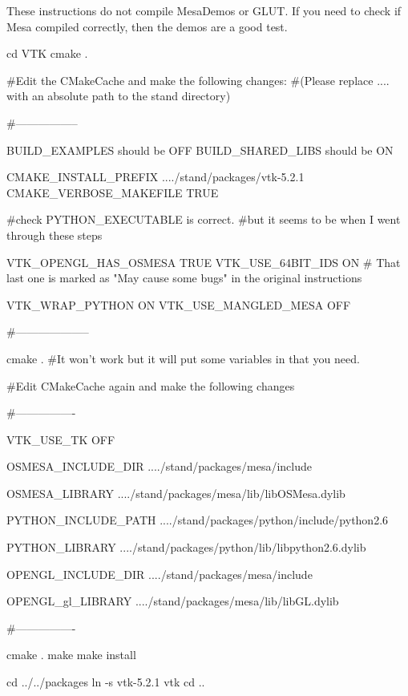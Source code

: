 These instructions do not compile MesaDemos or GLUT.
If you need to check if Mesa compiled correctly, then the demos are a good test.

\begin{shellCode}
cd VTK
cmake .

#Edit the CMakeCache and make the following changes: 
#(Please replace .... with an absolute path to the stand directory)

#-----------------

BUILD_EXAMPLES should be OFF
BUILD_SHARED_LIBS should be ON

CMAKE_INSTALL_PREFIX	..../stand/packages/vtk-5.2.1
CMAKE_VERBOSE_MAKEFILE	TRUE

#check PYTHON_EXECUTABLE is correct.
#but it seems to be when I went through these steps

VTK_OPENGL_HAS_OSMESA	TRUE
VTK_USE_64BIT_IDS	ON
# That last one is marked as "May cause some bugs" in the original instructions

VTK_WRAP_PYTHON	ON
VTK_USE_MANGLED_MESA	OFF

#--------------------

cmake .
#It won't work but it will put some variables in that you need.

#Edit CMakeCache again and make the following changes

#----------------

VTK_USE_TK	OFF

OSMESA_INCLUDE_DIR	..../stand/packages/mesa/include

OSMESA_LIBRARY	..../stand/packages/mesa/lib/libOSMesa.dylib

PYTHON_INCLUDE_PATH	..../stand/packages/python/include/python2.6

PYTHON_LIBRARY	..../stand/packages/python/lib/libpython2.6.dylib

OPENGL_INCLUDE_DIR	..../stand/packages/mesa/include

OPENGL_gl_LIBRARY	..../stand/packages/mesa/lib/libGL.dylib

#----------------

cmake .
make
make install


cd ../../packages
ln -s vtk-5.2.1 vtk
cd ..
\end{shellCode}

